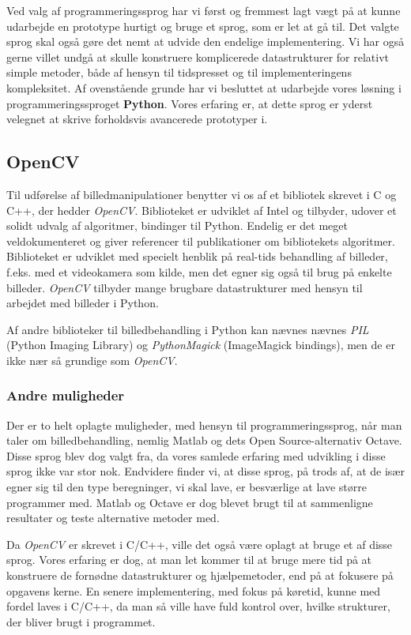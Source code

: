 {
{\sffamily Ved valg af programmeringssprog har vi først og fremmest lagt
vægt på at kunne udarbejde en prototype hurtigt og bruge et sprog, som
er let at gå til. Det valgte sprog skal også gøre det nemt at udvide den
endelige implementering. Vi har også gerne villet undgå at skulle
konstruere komplicerede datastrukturer for relativt simple metoder, både
af hensyn til tidspresset og til implementeringens kompleksitet. Af
ovenstående grunde har vi besluttet at udarbejde vores løsning i
programmeringssproget \textbf{Python}\cite{PythonLanguage}. Vores
erfaring er, at dette sprog er yderst velegnet at skrive forholdsvis
avancerede prototyper i.
}

\subsection{OpenCV}
Til udførelse af billedmanipulationer benytter vi os af et bibliotek
skrevet i C og C++, der hedder \emph{OpenCV}\cite{OpenCV}. Biblioteket
er udviklet af Intel og tilbyder, udover et solidt udvalg af algoritmer,
bindinger til Python\cite{OpenCVPython}. Endelig er det meget
veldokumenteret og giver referencer til publikationer om bibliotekets
algoritmer. Biblioteket er udviklet med specielt henblik på real-tids
behandling af billeder, f.eks. med et videokamera som kilde, men det
egner sig også til brug på enkelte billeder.  \emph{OpenCV} tilbyder
mange brugbare datastrukturer med hensyn til arbejdet med billeder i
Python.

Af andre biblioteker til billedbehandling i Python kan nævnes nævnes
\emph{PIL} (Python Imaging Library)\cite{PIL} og \emph{PythonMagick}
(ImageMagick bindings)\cite{PMck}, men de er ikke nær så grundige som
\emph{OpenCV}.

\subsubsection{Andre muligheder}
Der er to helt oplagte muligheder, med hensyn til programmeringssprog,
når man taler om billedbehandling, nemlig Matlab\cite{MatlabLang} og
dets Open Source-alternativ Octave\cite{Octave}. Disse sprog blev dog
valgt fra, da vores samlede erfaring med udvikling i disse sprog ikke
var stor nok.  Endvidere finder vi, at disse sprog, på trods af, at de
især egner sig til den type beregninger, vi skal lave, er besværlige at
lave større programmer med. Matlab og Octave er dog blevet brugt til at
sammenligne resultater og teste alternative metoder med.

Da \emph{OpenCV} er skrevet i C/C++, ville det også være oplagt at bruge
et af disse sprog. Vores erfaring er dog, at man let kommer til at bruge
mere tid på at konstruere de fornødne datastrukturer og hjælpemetoder,
end på at fokusere på opgavens kerne. En senere implementering, med
fokus på køretid, kunne med fordel laves i C/C++, da man så ville have
fuld kontrol over, hvilke strukturer, der bliver brugt i programmet.

}
